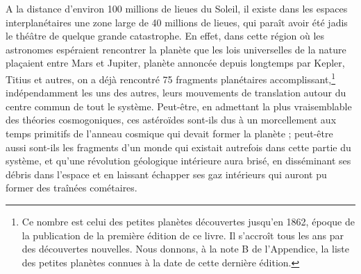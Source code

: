 \documentclass[a4paper, 11pt, oneside, landscape]{article}
\begin{document}
A la distance d'environ 100 millions de lieues du Soleil, il existe dans les espaces interplanétaires une zone large de 40 millions de lieues, qui paraît avoir été jadis le théâtre de quelque grande catastrophe. En effet, dans cette région où les astronomes espéraient rencontrer la planète que les lois universelles de la nature plaçaient entre Mars et Jupiter, planète annoncée depuis longtemps par Kepler, Titius et autres, on a déjà rencontré 75 fragments planétaires accomplissant,\footnote{Ce nombre est celui des petites planètes découvertes jusqu'en 1862, époque de la publication de la première édition de ce livre. Il s'accroît tous les ans par des découvertes nouvelles. Nous donnons, à la note B de l'Appendice, la liste des petites planètes connues à la date de cette dernière édition.} indépendamment les uns des autres, leurs mouvements de translation autour du centre commun de tout le système. Peut-être, en admettant la plus vraisemblable des théories cosmogoniques, ces astéroïdes sont-ils dus à un morcellement aux temps primitifs de l'anneau cosmique qui devait former la planète ; peut-être aussi sont-ils les fragments d'un monde qui existait autrefois dans cette partie du système, et qu'une révolution géologique intérieure aura brisé, en disséminant ses débris dans l'espace et en laissant échapper ses gaz intérieurs qui auront pu former des traînées cométaires.
\end{document}
